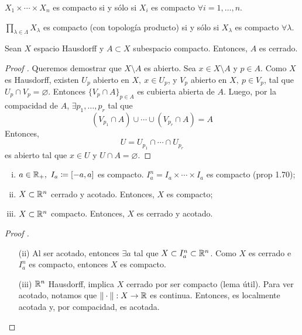 \begin{corollary}
	$X_{1} \times \cdots \times X_{n}$ es compacto si y sólo si $X_{i}$ es compacto $\forall i = 1,\dots,n$.
\end{corollary}

\begin{theorem}[Tychonoff]
	$\prod_{\lambda\in\Lambda} X_{\lambda}$ es compacto (con topología producto) si y sólo si $X_{\lambda}$ es compacto $\forall \lambda$.
\end{theorem}

\begin{lemma}[útil]
	Sean $X$ espacio Hausdorff y $A \subset X$ subespacio compacto. Entonces, $A$ es cerrado.
\end{lemma}
\begin{proof}[Proof ]
	Queremos demostrar que $X \setminus A$ es abierto. Sea $x \in X \setminus A$ y $p \in A$. Como $X$ es Hausdorff, existen $U_p$ abierto en $X,\ x \in U_p$, y $V_p$ abierto en $X,\ p \in V_p$, tal que $U_p \cap V_p = \varnothing$. Entonces $\{V_p \cap A\}_{p\in A}$ es cubierta abierta de $A$. Luego, por la compacidad de $A$, $\exists p_{1},\dots,p_{r}$ tal que
	\[ (V_{p_1} \cap A) \cup \cdots \cup (V_{p_r} \cap A) = A \]
	Entonces,
	\[ U = U_{p_{1}} \cap \cdots \cap U_{p_{r}} \]
	es abierto tal que $x \in U$ y $U \cap A = \varnothing$.
\end{proof}

\begin{corollary}
	\begin{enumerate}[i.]
		\item $a \in \mathbb{R}_{+},\ I_a \coloneq [-a,a]$ es compacto. $I_{a}^{n} = I_a \times \cdots \times I_a$ es compacto (prop 1.70);

		\item $X \subset \mathbb{R}^n$ cerrado y acotado. Entonces, $X$ es compacto;
		
		\item $X \subset \mathbb{R}^n$ compacto. Entonces, $X$ es cerrado y acotado.
	\end{enumerate}
\end{corollary}
\begin{proof}[Proof ]
	\begin{enumerate}
		\item[(ii)] Al ser acotado, entonces $\exists a$ tal que $X \subset I_{a}^{n} \subset \mathbb{R}^n$. Como $X$ es cerrado e $I_{a}^{n}$ es compacto, entonces $X$ es compacto.
		
		\item[(iii)] $\mathbb{R}^n$ Hausdorff, implica $X$ cerrado por ser compacto (lema útil). Para ver acotado, notamos que $\| \cdot \| : X \to \mathbb{R}$ es continua. Entonces, es localmente acotada y, por compacidad, es acotada.
	\end{enumerate}
\end{proof}

